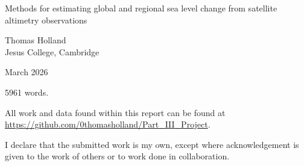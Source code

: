 \begin{titlepage}
{
      \vspace*{5cm}
      \centering
    {\Huge Methods for estimating global and regional sea level change from satellite altimetry observations}\par
	\vspace*{\fill}
        \Large{Thomas Holland\\ Jesus College, Cambridge}\par
    \vspace{1cm}
    \large{March 2026}
    \restoregeometry
    }
\end{titlepage}

\clearpage
\thispagestyle{empty}

\begin{center}
\vspace*{\fill}

{5961 words.}

\vspace{12pt}

All work and data found within this report can be found at \url{https://github.com/0thomasholland/Part_III_Project}.


\vspace{12pt}

I declare that the submitted work is my own, except where
acknowledgement is given to the work of others or to work done in
collaboration.

\end{center}